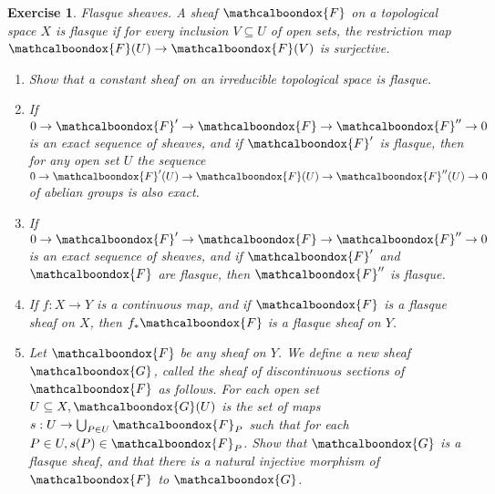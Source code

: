 \documentclass[12pt]{article}
\newtheorem{ex}{Exercise}[section]
\theoremstyle{definition}
\newcommand{\sF}{\ensuremath{\mathcalboondox{F}}}
\newcommand{\sG}{\ensuremath{\mathcalboondox{G}}}
\begin{document}
\begin{ex}
	Flasque sheaves. A sheaf $\sF$ on a topological space $X$ is flasque if for every inclusion $V \subseteq U$ of open sets, the restriction map $\sF(U) \to \sF(V)$ is surjective.
	\begin{enumerate}[label=\alph*)]
		\item Show that a constant sheaf on an irreducible topological space is flasque.
		\item If $0 \to \sF' \to \sF \to \sF'' \to 0$ is an exact sequence of sheaves, and if $\sF'$ is flasque, then for any open set $U$ the sequence $0 \to \sF'(U) \to \sF(U) \to \sF''(U) \to 0$ of abelian groups is also exact.
		\item If $0 \to \sF' \to \sF \to \sF'' \to 0$ is an exact sequence of sheaves, and if $\sF'$ and $\sF$ are flasque, then $\sF''$ is flasque.
		\item If $f: X \to Y$ is a continuous map, and if $\sF$ is a flasque sheaf on $X$, then $f_{*}\sF$ is a flasque sheaf on $Y$.
		\item Let $\sF$ be any sheaf on $Y$. We define a new sheaf $\sG$, called the sheaf of discontinuous sections of $\sF$ as follows. For each open set $U \subseteq X, \sG(U)$ is the set of maps $s: U \to \bigcup_{P \in U} \sF_P$ such that for each $P \in U, s(P) \in \sF_P$. Show that $\sG$ is a flasque sheaf, and that there is a natural injective morphism of $\sF$ to $\sG$.
	\end{enumerate}
\end{ex}
\end{document}
